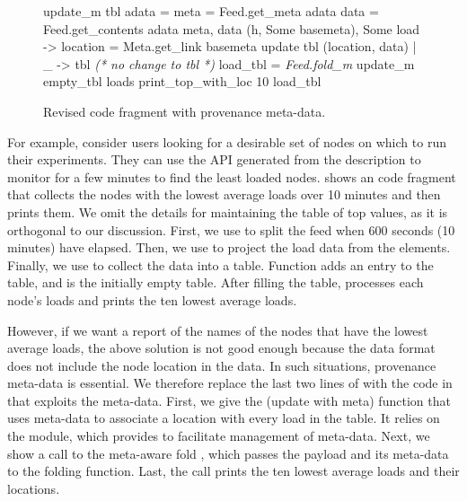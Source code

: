 \begin{figure}[tb]

\begin{codebox}
 update_m  tbl adata =
   meta = Feed.get_meta adata 
   data = Feed.get_contents adata 
   meta, data  
    (h, Some basemeta), Some load ->
       location = Meta.get_link basemeta 
      update tbl (location, data)
  | _ -> tbl \textit{ (* no change to tbl *)} 
 load_tbl = \textit{Feed.fold_m} update_m empty_tbl loads
 print_top_with_loc 10 load_tbl
\end{codebox}
  \caption{Revised code fragment with provenance meta-data. }
\label{fig:sample-loads-prov}
\end{figure}

For example, consider \planetlab users looking for a desirable set of
nodes on which to run their experiments. 
They can use the API generated from the \comon description 
to monitor \planetlab for a few
minutes to find the least loaded nodes. 
shows an \ocaml{} code fragment that collects the nodes with the
lowest average loads over 10 minutes and then prints them. 
We omit the details for maintaining the table of top values, as it is
orthogonal to our discussion. 
First, we use  to
split the feed when 600 seconds (10 minutes) have elapsed. Then, we
use  to project the load data from the \comon
elements. Finally, we use  to collect the data
into a table. Function  adds an entry to the table, and
 is the initially empty table.
After filling the table, 
processes each node's loads
and prints the ten lowest average loads.

However, if we want a report of the names of the nodes that have 
the lowest average loads, the above solution is not good enough
because the \comon data format does not include the node location in the data.
In such situations, provenance meta-data is essential. 
We therefore replace the last two lines of
 with the code in
 that exploits the meta-data. First, we
give the
 (update with meta) function that uses
meta-data to associate a location with every load in the table. It relies on the  module, 
which \padsd{} provides to facilitate management of meta-data. Next, 
we show a call to the meta-aware fold , which passes the 
payload and its meta-data to the folding
function.  Last, the call  prints the ten 
lowest average loads and their locations.

